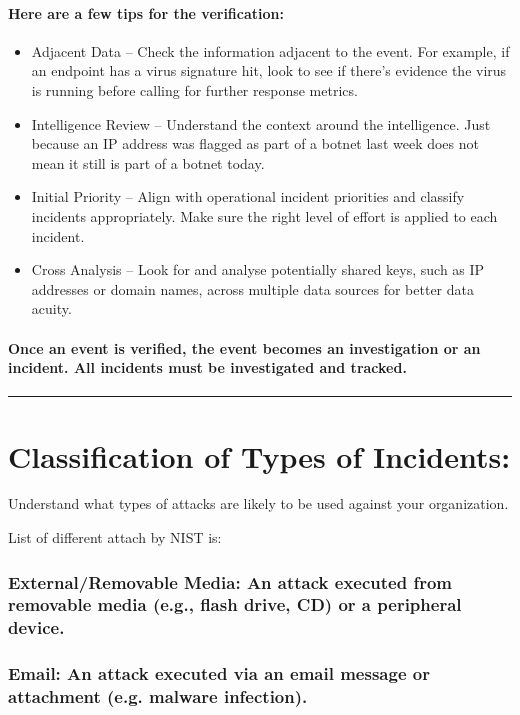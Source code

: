\documentclass[british]{article}
\begin{document}
\paragraph*{Here are a few tips for the verification:}
\begin{itemize}
\item Adjacent Data -- Check the information adjacent to the event. For
example, if an endpoint has a virus signature hit, look to see if
there's evidence the virus is running before calling for further
response metrics. 
\item Intelligence Review -- Understand the context around the intelligence.
Just because an IP address was flagged as part of a botnet last week
does not mean it still is part of a botnet today. 
\item Initial Priority -- Align with operational incident priorities and
classify incidents appropriately. Make sure the right level of effort
is applied to each incident. 
\item Cross Analysis -- Look for and analyse potentially shared keys, such
as IP addresses or domain names, across multiple data sources for
better data acuity. 
\end{itemize}

\paragraph{Once an event is verified, the event becomes an investigation or
an incident. All incidents must be investigated and tracked.}

\rule[0.5ex]{0.75\columnwidth}{1pt}

\section{Classification of Types of Incidents:}

Understand what types of attacks are likely to be used against your
organization.

List of different attach by NIST is:

\subsubsection{External/Removable Media: An attack executed from removable media
(e.g., flash drive, CD) or a peripheral device.}

\subsubsection{Email: An attack executed via an email message or attachment (e.g.
malware infection).}
\end{document}
